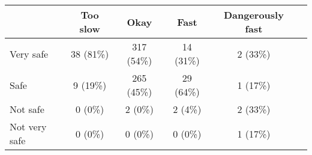 \begin{tabular}{l c|c|c|c|c} \hline  & Too slow & Okay & Fast & Dangerously fast \\ 
\hline Very safe & 38 (81\%) & 317 (54\%) & 14 (31\%) & 2 (33\%) \\ 
  Safe & 9 (19\%) & 265 (45\%) & 29 (64\%) & 1 (17\%) \\ 
  Not safe & 0 (0\%) & 2 (0\%) & 2 (4\%) & 2 (33\%) \\ 
  Not very safe & 0 (0\%) & 0 (0\%) & 0 (0\%) & 1 (17\%) \\ 
 \hline \end{tabular}